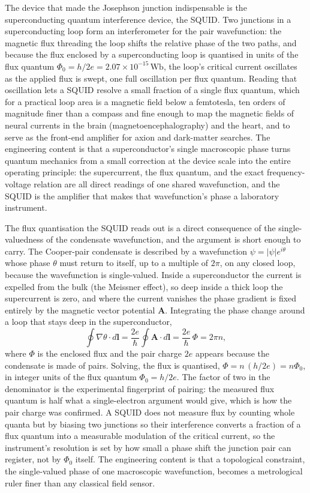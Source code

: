 The device that made the Josephson junction indispensable is the
superconducting quantum interference device, the SQUID. Two junctions in a
superconducting loop form an interferometer for the pair wavefunction: the
magnetic flux threading the loop shifts the relative phase of the two
paths, and because the flux enclosed by a superconducting loop is quantised
in units of the flux quantum $\Phi_0 = h/2e = 2.07\times 10^{-15}\,\si{
\weber}$, the loop's critical current oscillates as the applied flux is
swept, one full oscillation per flux quantum. Reading that oscillation lets
a SQUID resolve a small fraction of a single flux quantum, which for a
practical loop area is a magnetic field below a femtotesla, ten orders of
magnitude finer than a compass and fine enough to map the magnetic fields
of neural currents in the brain (magnetoencephalography) and the heart, and
to serve as the front-end amplifier for axion and dark-matter searches. The
engineering content is that a superconductor's single macroscopic phase
turns quantum mechanics from a small correction at the device scale into
the entire operating principle: the supercurrent, the flux quantum, and the
exact frequency-voltage relation are all direct readings of one shared
wavefunction, and the SQUID is the amplifier that makes that wavefunction's
phase a laboratory instrument.

\begin{mastery}
The flux quantisation the SQUID reads out is a direct consequence of the
single-valuedness of the condensate wavefunction, and the argument is short
enough to carry. The Cooper-pair condensate is described by a wavefunction
$\psi = |\psi|e^{i\theta}$ whose phase $\theta$ must return to itself, up to
a multiple of $2\pi$, on any closed loop, because the wavefunction is
single-valued. Inside a superconductor the current is expelled from the
bulk (the Meissner effect), so deep inside a thick loop the supercurrent is
zero, and where the current vanishes the phase gradient is fixed entirely by
the magnetic vector potential $\mathbf{A}$. Integrating the phase change
around a loop that stays deep in the superconductor,
\[
\oint \nabla\theta\cdot d\mathbf{l}
= \frac{2e}{\hbar}\oint \mathbf{A}\cdot d\mathbf{l}
= \frac{2e}{\hbar}\,\Phi = 2\pi n,
\]
where $\Phi$ is the enclosed flux and the pair charge $2e$ appears because
the condensate is made of pairs. Solving, the flux is quantised,
$\Phi = n\,(h/2e) = n\Phi_0$, in integer units of the flux quantum
$\Phi_0 = h/2e$. The factor of two in the denominator is the experimental
fingerprint of pairing: the measured flux quantum is half what a
single-electron argument would give, which is how the pair charge was
confirmed. A SQUID does not measure flux by counting whole quanta but by
biasing two junctions so their interference converts a fraction of a flux
quantum into a measurable modulation of the critical current, so the
instrument's resolution is set by how small a phase shift the junction pair
can register, not by $\Phi_0$ itself. The engineering content is that a
topological constraint, the single-valued phase of one macroscopic
wavefunction, becomes a metrological ruler finer than any classical field
sensor.
\end{mastery}


